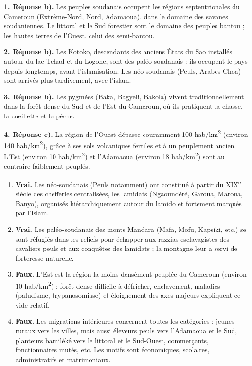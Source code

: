 \documentclass[11pt]{article}
\newcommand{\cle}[1]{{\popxbold\color{popdark}#1}}
\begin{document}
\begin{corrige}
\textbf{1. Réponse b).} Les peuples soudanais occupent les régions septentrionales du Cameroun (Extrême-Nord, Nord, Adamaoua), dans le domaine des savanes soudaniennes. Le littoral et le Sud forestier sont le domaine des peuples bantou ; les hautes terres de l'Ouest, celui des semi-bantou.

\textbf{2. Réponse b).} Les Kotoko, descendants des anciens États du Sao installés autour du lac Tchad et du Logone, sont des \cle{paléo-soudanais} : ils occupent le pays depuis longtemps, avant l'islamisation. Les néo-soudanais (Peuls, Arabes Choa) sont arrivés plus tardivement, avec l'islam.

\textbf{3. Réponse b).} Les pygmées (Baka, Bagyeli, Bakola) vivent traditionnellement dans la forêt dense du Sud et de l'Est du Cameroun, où ils pratiquent la chasse, la cueillette et la pêche.

\textbf{4. Réponse c).} La région de l'Ouest dépasse couramment 100 hab/km\textsuperscript{2} (environ 140 hab/km\textsuperscript{2}), grâce à ses sols volcaniques fertiles et à un peuplement ancien. L'Est (environ 10 hab/km\textsuperscript{2}) et l'Adamaoua (environ 18 hab/km\textsuperscript{2}) sont au contraire faiblement peuplés.
\end{corrige}

\begin{corrige}
\begin{enumerate}
\item \textbf{Vrai.} Les néo-soudanais (Peuls notamment) ont constitué à partir du XIX\textsuperscript{e} siècle des chefferies centralisées, les \cle{lamidats} (Ngaoundéré, Garoua, Maroua, Banyo), organisés hiérarchiquement autour du lamido et fortement marqués par l'islam.
\item \textbf{Vrai.} Les paléo-soudanais des monts Mandara (Mafa, Mofu, Kapsiki, etc.) se sont réfugiés dans les reliefs pour échapper aux razzias esclavagistes des cavaliers peuls et aux conquêtes des lamidats ; la montagne leur a servi de forteresse naturelle.
\item \textbf{Faux.} L'Est est la région la moins densément peuplée du Cameroun (environ 10 hab/km\textsuperscript{2}) : forêt dense difficile à défricher, enclavement, maladies (paludisme, trypanosomiase) et éloignement des axes majeurs expliquent ce vide relatif.
\item \textbf{Faux.} Les migrations intérieures concernent toutes les catégories : jeunes ruraux vers les villes, mais aussi éleveurs peuls vers l'Adamaoua et le Sud, planteurs bamiléké vers le littoral et le Sud-Ouest, commerçants, fonctionnaires mutés, etc. Les motifs sont économiques, scolaires, administratifs et matrimoniaux.
\end{enumerate}
\end{corrige}
\end{document}
